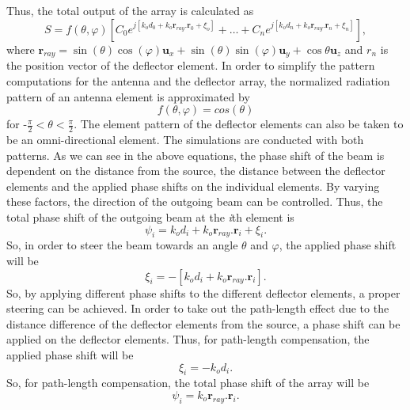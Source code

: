\documentclass[titlepage]{article}
\begin{document}
\newline
Thus, the total output of the array is calculated as
\begin{equation}
    S=f(\theta,\varphi)[C_0e^{j[k_od_0+k_o\textbf{r}_{ray}.\textbf{r}_0 + \xi_o]}+\ldots + C_ne^{j[k_od_n+k_o\textbf{r}_{ray}.\textbf{r}_n + \xi_n]}],
\end{equation}
where $\textbf{r}_{ray}=\sin(\theta) \cos(\varphi)\textbf{u}_x+\sin(\theta) \sin(\varphi)\textbf{u}_y+\cos\theta\textbf{u}_z $ and $r_n$ is the position vector of the deflector element.
\newline
In order to simplify the pattern computations for the antenna and the deflector array, the normalized radiation pattern of an antenna element is approximated by
\begin{equation}
f(\theta,\varphi)=cos(\theta)
\end{equation}
for -$\frac{\pi}{2}<\theta<\frac{\pi}{2}$. The element pattern of the deflector elements can also be taken to be an omni-directional element. The simulations are conducted with both patterns.
\newline
As we can see in the above equations, the phase shift of the beam is dependent on the distance from the source, the distance between the deflector elements and the applied phase shifts on the individual elements. By varying these factors, the direction of the outgoing beam can be controlled. Thus, the total phase shift of the outgoing beam at the \emph{i}th element is
\begin{equation}
    \psi_i = k_od_i+k_o\textbf{r}_{ray}.\textbf{r}_i + \xi_i .
    \label{eq:Phase}
\end{equation}
So, in order to steer the beam towards an angle $\theta$ and $\varphi$, the applied phase shift will be
\begin{equation}
    \xi_i = -[k_od_i + k_o\textbf{r}_{ray}.\textbf{r}_i].
\end{equation}
So, by applying different phase shifts to the different deflector elements, a proper steering can be achieved.
\newline
In order to take out the path-length effect due to the distance difference of the deflector elements from the source, a phase shift can be applied on the deflector elements. Thus, for path-length compensation, the applied phase shift will be
\begin{equation}
\xi_i = -k_od_i.
\end{equation}
So, for path-length compensation, the total phase shift of the array will be
\begin{equation}
\psi_i = k_o\textbf{r}_{ray}.\textbf{r}_i.
\end{equation}
\end{document}
